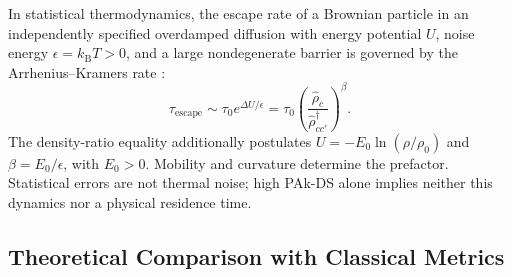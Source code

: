 \begin{proposition}
  \label{prop:kramers_escape}
  In statistical thermodynamics, the escape rate of a Brownian
  particle in an independently specified overdamped diffusion with
  energy potential $U$, noise energy $\epsilon=k_{\mathrm B}T>0$,
  and a large nondegenerate barrier is governed by the
  Arrhenius--Kramers rate \parencite{kramers1940}:
  \begin{equation}
    \tau_{\mathrm{escape}}\sim\tau_0e^{\Delta U/\epsilon}
    =\tau_0\left(
    \frac{\hat{\rho}_c}{\hat{\rho}_{cc'}^\dagger} \right)^{\beta}.
    \label{eq:kramers_time}
  \end{equation}
  The density-ratio equality additionally postulates
  $U=-E_0\ln(\rho/\rho_0)$ and $\beta=E_0/\epsilon$, with $E_0>0$.
  Mobility and curvature determine the prefactor. Statistical errors
  are not thermal noise; high PAk-DS alone implies neither this
  dynamics nor a physical residence time.
\end{proposition}

\subsection{Theoretical Comparison with Classical Metrics}
\label{subsec:cvi_theoretical_comparison}

